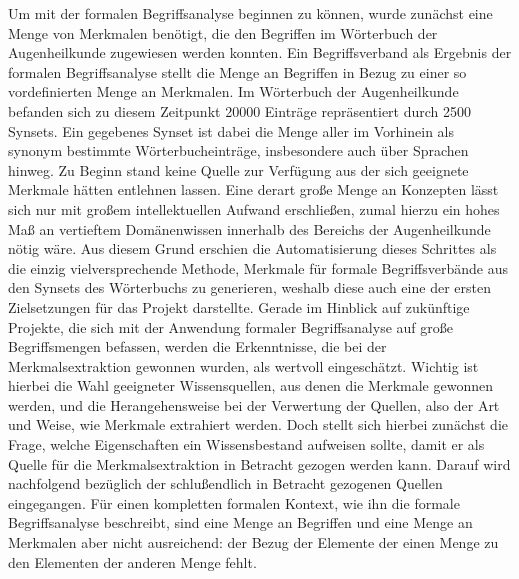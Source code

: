 \documentclass[pagesize,DIV=calc,12pt,draft]{scrreprt}
\begin{document}
Um mit der formalen Begriffsanalyse beginnen zu können, wurde zunächst eine Menge von Merkmalen benötigt, die den Begriffen im Wörterbuch der Augenheilkunde zugewiesen werden konnten. 
Ein Begriffsverband als Ergebnis der formalen Begriffsanalyse stellt die Menge an Begriffen in Bezug zu einer so vordefinierten Menge an Merkmalen. 
Im Wörterbuch der Augenheilkunde befanden sich zu diesem Zeitpunkt 20000 Einträge repräsentiert durch 2500 Synsets. 
Ein gegebenes Synset ist dabei die Menge aller im Vorhinein als synonym bestimmte Wörterbucheinträge, insbesondere auch über Sprachen hinweg. 
Zu Beginn stand keine Quelle zur Verfügung aus der sich geeignete Merkmale hätten entlehnen lassen. 
Eine derart große Menge an Konzepten lässt sich nur mit großem intellektuellen Aufwand erschließen, zumal hierzu ein hohes Maß an vertieftem Domänenwissen innerhalb des Bereichs der Augenheilkunde nötig wäre. 
Aus diesem Grund erschien die Automatisierung dieses Schrittes als die einzig vielversprechende Methode, Merkmale für formale Begriffsverbände aus den Synsets des Wörterbuchs zu generieren, weshalb diese auch eine der ersten Zielsetzungen für das Projekt darstellte. 
Gerade im Hinblick auf zukünftige Projekte, die sich mit der Anwendung formaler Begriffsanalyse auf große Begriffsmengen befassen, werden die Erkenntnisse, die bei der Merkmalsextraktion gewonnen wurden, als wertvoll eingeschätzt. 
Wichtig ist hierbei die Wahl geeigneter Wissensquellen, aus denen die Merkmale gewonnen werden, und die Herangehensweise bei der Verwertung der Quellen, also der Art und Weise, wie Merkmale extrahiert werden. 
Doch stellt sich hierbei zunächst die Frage, welche Eigenschaften ein Wissensbestand aufweisen sollte, damit er als Quelle für die Merkmalsextraktion in Betracht gezogen werden kann. 
Darauf wird nachfolgend bezüglich der schlußendlich in Betracht gezogenen Quellen eingegangen. 
Für einen kompletten formalen Kontext, wie ihn die formale Begriffsanalyse beschreibt, sind eine Menge an Begriffen und eine Menge an Merkmalen aber nicht ausreichend: der Bezug der Elemente der einen Menge zu den Elementen der anderen Menge fehlt. 
\end{document}
